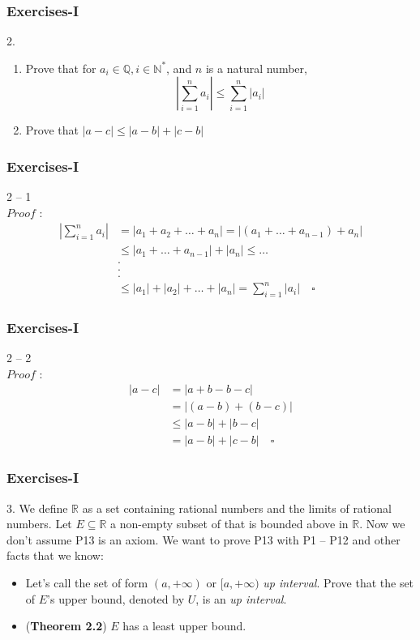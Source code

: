 \documentclass[12pt, t]{beamer}
\renewcommand{\emph}[1]{{\color{Turquoise3}\textsl{#1}}}
\begin{document}
\begin{frame}
    \frametitle{Exercises-I}
    2.
    \begin{enumerate}
        \item Prove that for $a_i\in \mathbb{Q}, i\in \mathbb{N^*}$, and $n$ is a natural number,
              \begin{equation*}
                  |\sum^n_{i=1}a_i|\leq\sum^n_{i=1}|a_i|
              \end{equation*}
        \item Prove that $|a-c|\leq |a-b| +|c-b|$
    \end{enumerate}
\end{frame}

\begin{frame}
    \frametitle{Exercises-I}
    2 -- 1\\
    $Proof$ :
    \begin{equation*}
        \begin{split}
            |\sum^n_{i=1}a_i| &=|a_1+a_2+\dots+a_n|
            =|(a_1+\dots+a_{n-1})+a_n|\\
            &\leq |a_1+\dots+a_{n-1}|+|a_n|
            \leq \dots\\
            &.\\
            &.\\
            &.\\
            &\leq |a_1|+|a_2|+\dots+|a_n|=\sum^n_{i=1}|a_i|\quad\square
        \end{split}
    \end{equation*}
\end{frame}

\begin{frame}
    \frametitle{Exercises-I}
    2 -- 2\\
    $Proof$ :
    \begin{equation*}
        \begin{split}
            |a-c|&=|a+b-b-c|\\
            &=|(a-b)+(b-c)|\\
            &\leq|a-b|+|b-c|\\
            &=|a-b|+|c-b| \quad \square
        \end{split}
    \end{equation*}
\end{frame}


\begin{frame}
    \frametitle{Exercises-I}
    3. We define $\mathbb{R}$ as a set containing rational numbers and the limits of rational numbers.
    Let $E\subseteq \mathbb{R}$ a non-empty subset of that is bounded above in $\mathbb{R}$. Now we don't
    assume P13 is an axiom. We want to prove P13 with P1 -- P12 and other facts that we know:
    \begin{itemize}
        \item Let's call the set of form $(a,+\infty)$ or $[a,+\infty)$ \emph{up interval}. Prove that the
              set of $E$'s upper bound, denoted by $U$, is an \emph{up interval}.
        \item (\textbf{Theorem 2.2}) $E$ has a least upper bound.
    \end{itemize}
\end{frame}
\end{document}
